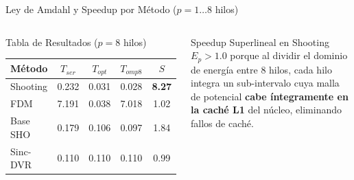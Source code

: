 \documentclass[aspectratio=169,10pt]{beamer}
\begin{document}
\begin{frame}{Ley de Amdahl y Speedup por Método ($p = 1\ldots 8$ hilos)}
\begin{columns}[T]
\begin{block}{Tabla de Resultados ($p=8$ hilos)}
\centering\small
\begin{tabular}{lcccc}
\toprule
\textbf{Método} & $T_{ser}$ & $T_{opt}$ & $T_{omp8}$ & $S$\\
\midrule
Shooting & 0.232 & 0.031 & 0.028 & \textbf{8.27}\\
FDM      & 7.191 & 0.038 & 7.018 & 1.02\\
Base SHO & 0.179 & 0.106 & 0.097 & 1.84\\
Sinc-DVR & 0.110 & 0.110 & 0.110 & 0.99\\
\bottomrule
\end{tabular}
\end{block}
\vspace{0.135cm}
\begin{alertbox}{Speedup Superlineal en Shooting}
$E_p > 1.0$ porque al dividir el dominio de energía entre 8 hilos, cada hilo integra un sub-intervalo cuya malla de potencial \textbf{cabe íntegramente en la caché L1} del núcleo, eliminando fallos de caché.
\end{alertbox}
\end{columns}
\end{frame}
\end{document}
